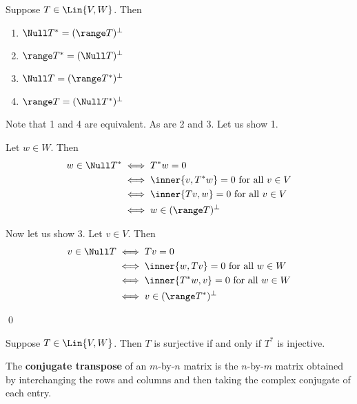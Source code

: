 \begin{theorem}
    Suppose $T \in \Lin{V, W}$. Then
    \begin{enumerate}
        \item $\Null T^* = (\range T)^\perp$
        \item $\range T^* = (\Null T)^\perp$
        \item $\Null T = (\range T^*)^\perp$
        \item $\range T = (\Null T^*)^\perp$
    \end{enumerate}

    \begin{proof*}
        Note that 1 and 4 are equivalent. As are 2 and 3. Let us show 1.

        Let $w \in W$. Then
        \begin{align*}
            w \in \Null T^* &\iff T^*w = 0 \\
            &\iff \inner{v, T^*w} = 0 \text{ for all $v \in V$} \\
            &\iff \inner{Tv, w} = 0 \text{ for all $v \in V$} \\
            &\iff w \in (\range T)^\perp
        \end{align*}

        Now let us show 3.
        Let $v \in V$. Then
        \begin{align*}
            v \in \Null T &\iff Tv = 0 \\
            &\iff \inner{w, Tv} = 0 \text{ for all $w \in W$} \\
            &\iff \inner{T^*w, v} = 0 \text{ for all $w \in W$} \\
            &\iff v \in (\range T^*)^\perp
        \end{align*}

        \qed
    \end{proof*}
\end{theorem}

\begin{theorem}
    Suppose $T \in \Lin{V, W}$. Then $T$ is surjective if and only if $T^*$ is injective.
\end{theorem}

\begin{definition} 
    The \textbf{conjugate transpose} of an $m$-by-$n$ matrix is the $n$-by-$m$ matrix obtained
    by interchanging the rows and columns and then taking the complex conjugate of each entry.
\end{definition}

